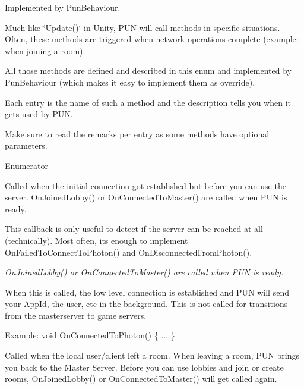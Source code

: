 Implemented by Pun\+Behaviour. 

Much like \char`\"{}\+Update()\char`\"{} in Unity, P\+UN will call methods in specific situations. Often, these methods are triggered when network operations complete (example\+: when joining a room).

All those methods are defined and described in this enum and implemented by Pun\+Behaviour (which makes it easy to implement them as override).

Each entry is the name of such a method and the description tells you when it gets used by P\+UN.

Make sure to read the remarks per entry as some methods have optional parameters. \begin{Desc}
\item[Enumerator]\par
\begin{description}
\item[{\em 
On\+Connected\+To\+Photon\hypertarget{group__public_api_ggaf30bbea51cc8c4b1ddc239d1c5c1468fa9583b114e6efdfd8068051d562391dc0}{}\label{group__public_api_ggaf30bbea51cc8c4b1ddc239d1c5c1468fa9583b114e6efdfd8068051d562391dc0}
}]Called when the initial connection got established but before you can use the server. On\+Joined\+Lobby() or On\+Connected\+To\+Master() are called when P\+UN is ready. 

This callback is only useful to detect if the server can be reached at all (technically). Most often, it\textquotesingle{}s enough to implement On\+Failed\+To\+Connect\+To\+Photon() and On\+Disconnected\+From\+Photon().

{\itshape On\+Joined\+Lobby() or On\+Connected\+To\+Master() are called when P\+UN is ready.}

When this is called, the low level connection is established and P\+UN will send your App\+Id, the user, etc in the background. This is not called for transitions from the masterserver to game servers.

Example\+: void On\+Connected\+To\+Photon() \{ ... \} \item[{\em 
On\+Left\+Room\hypertarget{group__public_api_ggaf30bbea51cc8c4b1ddc239d1c5c1468faf0e999adc414b29857944d5e5fabfe2e}{}\label{group__public_api_ggaf30bbea51cc8c4b1ddc239d1c5c1468faf0e999adc414b29857944d5e5fabfe2e}
}]Called when the local user/client left a room. When leaving a room, P\+UN brings you back to the Master Server. Before you can use lobbies and join or create rooms, On\+Joined\+Lobby() or On\+Connected\+To\+Master() will get called again.


\end{description}
\end{Desc}
